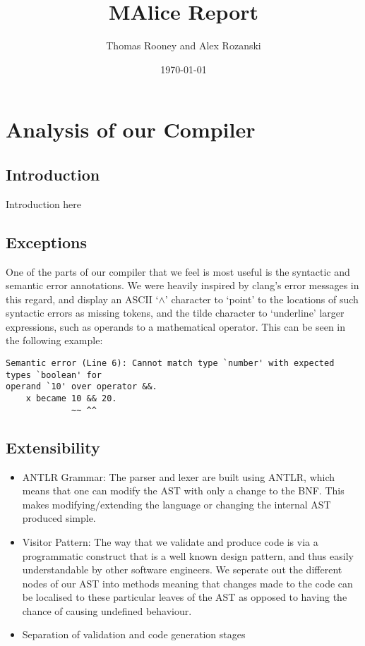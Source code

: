 \documentclass[a4wide, 11pt]{article}
\begin{document}
\title{MAlice Report}

\author{Thomas Rooney and Alex Rozanski}

\date{\today}

\maketitle

\section{Analysis of our Compiler}

\subsection{Introduction}

Introduction here

\subsection{Exceptions}

One of the parts of our compiler that we feel is most useful is the syntactic and semantic error annotations. We were heavily inspired by clang's error messages in this regard, and display an ASCII `$\wedge$' character to `point' to the locations of such syntactic errors as missing tokens, and the tilde character to `underline' larger expressions, such as operands to a mathematical operator. This can be seen in the following example:

\begin{verbatim}
Semantic error (Line 6): Cannot match type `number' with expected types `boolean' for
operand `10' over operator &&.
    x became 10 && 20.
             ~~ ^^  
\end{verbatim}

\subsection{Extensibility}

\begin{itemize}
\item
ANTLR Grammar: The parser and lexer are built using ANTLR, which means that one can modify the AST with only a change to the BNF. This makes modifying/extending the language or changing the internal AST produced simple.
\item
Visitor Pattern: The way that we validate and produce code is via a programmatic construct that is a well known design pattern, and thus easily understandable by other software engineers. We seperate out the different nodes of our AST into methods meaning that changes made to the code can be localised to these particular leaves of the AST as opposed to having the chance of causing undefined behaviour. 
\item
Separation of validation and code generation stages
\end{itemize}
\end{document}
